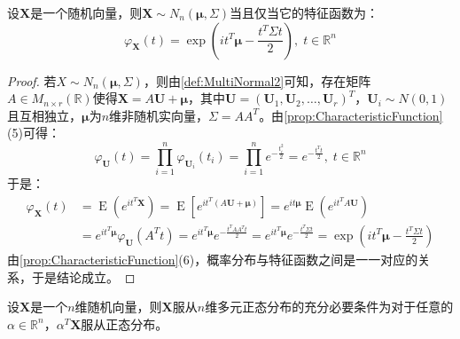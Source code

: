 \begin{theorem}\label{theo:c.f.MultiNormal}
	设$\mathbf{X}$是一个随机向量，则$\mathbf{X}\sim N_n(\boldsymbol{\mu},\Sigma)$当且仅当它的特征函数为：
	\begin{equation*}
		\varphi_\mathbf{X}(t)=\exp\left(it^T\boldsymbol{\mu}-\frac{t^T\Sigma t}{2}\right),\;t\in\mathbb{R}^{n}
	\end{equation*}
\end{theorem}
\begin{proof}
	若$X\sim N_n(\boldsymbol{\mu},\Sigma)$，则由\cref{def:MultiNormal2}可知，存在矩阵$A\in M_{n\times r}(\mathbb{R})$使得$\mathbf{X}=A\mathbf{U}+\boldsymbol{\mu}$，其中$\mathbf{U}=(\mathbf{U}_1,\mathbf{U}_2,\dots,\mathbf{U}_r)^T$，$\mathbf{U}_i\sim N(0,1)$且互相独立，$\boldsymbol{\mu}$为$n$维非随机实向量，$\Sigma=AA^T$。由\cref{prop:CharacteristicFunction}(5)可得：
	\begin{equation*}
		\varphi_\mathbf{U}(t)=\prod_{i=1}^n\varphi_{\mathbf{U}_i}(t_i)
		=\prod_{i=1}^ne^{-\frac{t_i^2}{2}}=e^{-\frac{t^Tt}{2}},\;t\in\mathbb{R}^{n}
	\end{equation*}
	于是：
	\begin{align*}
		\varphi_\mathbf{X}(t)
		&=\operatorname{E}(e^{it^T\mathbf{X}})
		=\operatorname{E}[e^{it^T(A\mathbf{U}+\boldsymbol{\mu})}]
		=e^{it\boldsymbol{\mu}}\operatorname{E}(e^{it^TA\mathbf{U}}) \\
		&=e^{it^T\boldsymbol{\mu}}\varphi_\mathbf{U}(A^Tt)
		=e^{it^T\boldsymbol{\mu}}e^{-\frac{t^TAA^Tt}{2}}
		=e^{it^T\boldsymbol{\mu}}e^{-\frac{t^T\Sigma t}{2}}
		=\exp\left(it^T\boldsymbol{\mu}-\frac{t^T\Sigma t}{2}\right)
	\end{align*}
	由\cref{prop:CharacteristicFunction}(6)，概率分布与特征函数之间是一一对应的关系，于是结论成立。
\end{proof}
\begin{theorem}\label{theo:MultiNormal3}
	设$\mathbf{X}$是一个$n$维随机向量，则$\mathbf{X}$服从$n$维多元正态分布的充分必要条件为对于任意的$\alpha\in\mathbb{R}^{n}$，$\alpha^T\mathbf{X}$服从正态分布。
\end{theorem}
